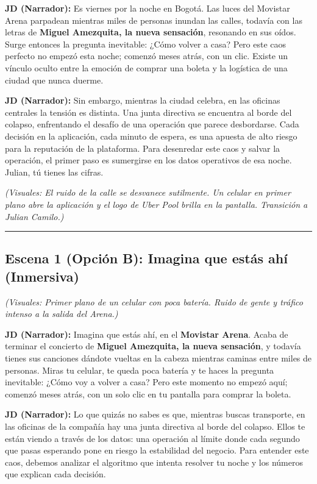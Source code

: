 \documentclass[11pt,a4paper]{article}
\begin{document}
\textbf{JD (Narrador):} 
Es viernes por la noche en Bogotá. Las luces del Movistar Arena parpadean mientras miles de personas inundan las calles, todavía con las letras de \textbf{Miguel Amezquita, la nueva sensación}, resonando en sus oídos. Surge entonces la pregunta inevitable: ¿Cómo volver a casa? Pero este caos perfecto no empezó esta noche; comenzó meses atrás, con un clic. Existe un vínculo oculto entre la emoción de comprar una boleta y la logística de una ciudad que nunca duerme. 

\textbf{JD (Narrador):} Sin embargo, mientras la ciudad celebra, en las oficinas centrales la tensión es distinta. Una junta directiva se encuentra al borde del colapso, enfrentando el desafío de una operación que parece desbordarse. Cada decisión en la aplicación, cada minuto de espera, es una apuesta de alto riesgo para la reputación de la plataforma. Para desenredar este caos y salvar la operación, el primer paso es sumergirse en los datos operativos de esa noche. Julian, tú tienes las cifras.

\textit{(Visuales: El ruido de la calle se desvanece sutilmente. Un celular en primer plano abre la aplicación y el logo de Uber Pool brilla en la pantalla. Transición a Julian Camilo.)}

\hrule
\vspace{0.5cm}

\subsection{Escena 1 (Opción B): Imagina que estás ahí (Inmersiva)}
\textit{(Visuales: Primer plano de un celular con poca batería. Ruido de gente y tráfico intenso a la salida del Arena.)}

\textbf{JD (Narrador):} 
Imagina que estás ahí, en el \textbf{Movistar Arena}. Acaba de terminar el concierto de \textbf{Miguel Amezquita, la nueva sensación}, y todavía tienes sus canciones dándote vueltas en la cabeza mientras caminas entre miles de personas. Miras tu celular, te queda poca batería y te haces la pregunta inevitable: ¿Cómo voy a volver a casa? Pero este momento no empezó aquí; comenzó meses atrás, con un solo clic en tu pantalla para comprar la boleta. 

\textbf{JD (Narrador):} Lo que quizás no sabes es que, mientras buscas transporte, en las oficinas de la compañía hay una junta directiva al borde del colapso. Ellos te están viendo a través de los datos: una operación al límite donde cada segundo que pasas esperando pone en riesgo la estabilidad del negocio. Para entender este caos, debemos analizar el algoritmo que intenta resolver tu noche y los números que explican cada decisión.
\end{document}
